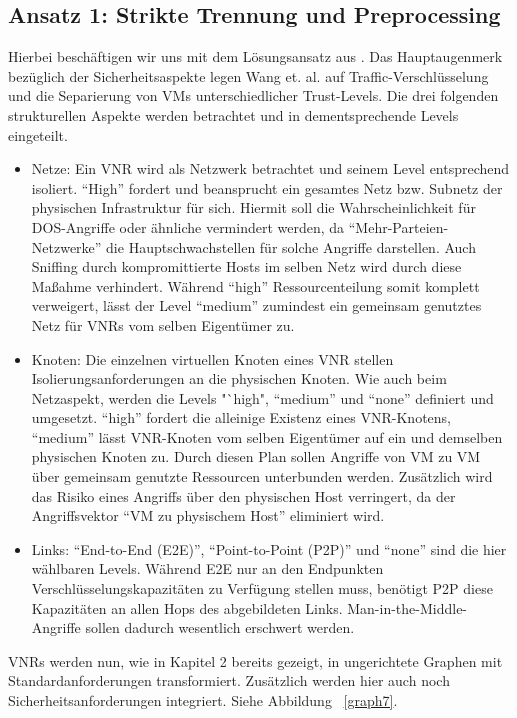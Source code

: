 \documentclass{lni}
\begin{document}
\subsection{Ansatz 1: Strikte Trennung und Preprocessing}
\label{subsec:ansatz1}

Hierbei beschäftigen wir uns mit dem Lösungsansatz aus \cite{wang2016towards}. 
Das Hauptaugenmerk bezüglich der Sicherheitsaspekte legen Wang et. al. auf Traffic-Verschlüsselung und die Separierung von VMs unterschiedlicher Trust-Levels. Die drei folgenden strukturellen Aspekte werden betrachtet und in dementsprechende Levels eingeteilt.
\begin{itemize}
\item Netze:\newline
Ein VNR wird als Netzwerk betrachtet und seinem Level entsprechend isoliert. "`High"' fordert und beansprucht ein gesamtes Netz bzw. Subnetz der physischen Infrastruktur für sich. Hiermit soll die Wahrscheinlichkeit für DOS-Angriffe oder ähnliche vermindert werden, da "`Mehr-Parteien-Netzwerke"' die Hauptschwachstellen für solche Angriffe darstellen. \cite{DOS} Auch Sniffing durch kompromittierte Hosts im selben Netz wird durch diese Maßahme verhindert. Während "`high"' Ressourcenteilung somit komplett verweigert, lässt der Level "`medium"' zumindest ein gemeinsam genutztes Netz für VNRs vom selben Eigentümer zu.

\item Knoten:\newline
Die einzelnen virtuellen Knoten eines VNR stellen Isolierungsanforderungen an die physischen Knoten. Wie auch beim Netzaspekt, werden die Levels "`high", "`medium"' und "`none"' definiert und umgesetzt. "`high"' fordert die alleinige Existenz eines VNR-Knotens, "`medium"' lässt VNR-Knoten vom selben Eigentümer auf ein und demselben physischen Knoten zu. Durch diesen Plan sollen Angriffe von VM zu VM über gemeinsam genutzte Ressourcen unterbunden werden. Zusätzlich wird das Risiko eines Angriffs über den physischen Host verringert, da der Angriffsvektor "`VM zu physischem Host"' eliminiert wird.

\item Links:\newline
"`End-to-End (E2E)"', "`Point-to-Point (P2P)"' und "`none"' sind die hier wählbaren Levels. Während E2E nur an den Endpunkten Verschlüsselungskapazitäten zu Verfügung stellen muss, benötigt P2P diese Kapazitäten an allen Hops des abgebildeten Links. Man-in-the-Middle-Angriffe sollen dadurch wesentlich erschwert werden. 
\end{itemize}
VNRs werden nun, wie in Kapitel 2 bereits gezeigt, in ungerichtete Graphen mit Standardanforderungen transformiert. Zusätzlich werden hier auch noch Sicherheitsanforderungen integriert. Siehe Abbildung ~\ref{graph7}.\newline
\end{document}

